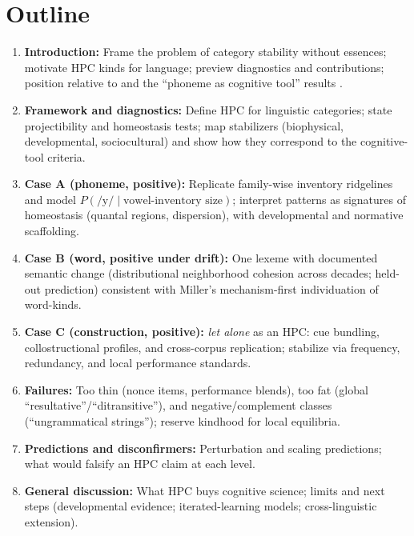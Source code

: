 \documentclass[12pt]{article}
\begin{document}
\section*{Outline}
\begin{enumerate}
  \item \textbf{Introduction:} Frame the problem of category stability without essences; motivate HPC kinds for language; preview diagnostics and contributions; position relative to \citet{Miller2021WordsSpeciesKinds} and the ``phoneme as cognitive tool'' results \citep{Ekstrom2025PhonemeTool}.
  \item \textbf{Framework and diagnostics:} Define HPC for linguistic categories; state projectibility and homeostasis tests; map stabilizers (biophysical, developmental, sociocultural) and show how they correspond to the cognitive-tool criteria.
  \item \textbf{Case A (phoneme, positive):} Replicate family-wise inventory ridgelines and model $P(\text{/y/}\mid \text{vowel-inventory size})$; interpret patterns as signatures of homeostasis (quantal regions, dispersion), with developmental and normative scaffolding.
  \item \textbf{Case B (word, positive under drift):} One lexeme with documented semantic change (distributional neighborhood cohesion across decades; held-out prediction) consistent with Miller's mechanism-first individuation of word-kinds.
  \item \textbf{Case C (construction, positive):} \textit{let alone} as an HPC: cue bundling, collostructional profiles, and cross-corpus replication; stabilize via frequency, redundancy, and local performance standards.
  \item \textbf{Failures:} Too thin (nonce items, performance blends), too fat (global ``resultative''/``ditransitive''), and negative/complement classes (``ungrammatical strings''); reserve kindhood for local equilibria.
  \item \textbf{Predictions and disconfirmers:} Perturbation and scaling predictions; what would falsify an HPC claim at each level.
  \item \textbf{General discussion:} What HPC buys cognitive science; limits and next steps (developmental evidence; iterated-learning models; cross-linguistic extension).
\end{enumerate}
\end{document}
